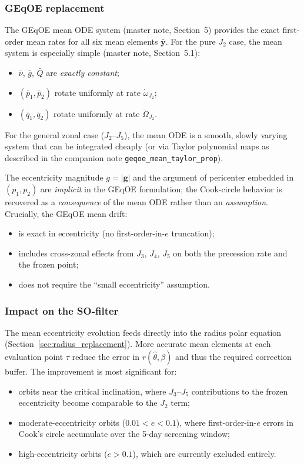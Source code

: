 \documentclass[11pt]{article}
\begin{document}
\subsubsection{GEqOE replacement}

The GEqOE mean ODE system (master note, Section~5) provides the exact
first-order mean rates for all six mean elements $\bar{\bm y}$. For the
pure $J_2$ case, the mean system is especially simple (master note,
Section~5.1):
\begin{itemize}
\item $\bar\nu$, $\bar g$, $\bar Q$ are \emph{exactly constant};
\item $(\bar p_1, \bar p_2)$ rotate uniformly at rate $\dot\omega_{J_2}$;
\item $(\bar q_1, \bar q_2)$ rotate uniformly at rate $\dot\Omega_{J_2}$.
\end{itemize}
For the general zonal case ($J_2$--$J_5$), the mean ODE is a smooth,
slowly varying system that can be integrated cheaply (or via Taylor polynomial
maps as described in the companion note \texttt{geqoe\_mean\_taylor\_prop}).

The eccentricity magnitude $g = |\bm g|$ and the argument of pericenter
embedded in $(p_1, p_2)$ are \emph{implicit} in the GEqOE formulation; the
Cook-circle behavior is recovered as a \emph{consequence} of the mean ODE
rather than an \emph{assumption}. Crucially, the GEqOE mean drift:
\begin{itemize}
\item is exact in eccentricity (no first-order-in-$e$ truncation);
\item includes cross-zonal effects from $J_3$, $J_4$, $J_5$ on both the
precession rate and the frozen point;
\item does not require the ``small eccentricity'' assumption.
\end{itemize}

\subsubsection{Impact on the SO-filter}

The mean eccentricity evolution feeds directly into the radius polar equation
(Section~\ref{sec:radius_replacement}). More accurate mean elements at each
evaluation point $\tau$ reduce the error in $r(\hat\theta, \beta)$ and thus
the required correction buffer. The improvement is most significant for:
\begin{itemize}
\item orbits near the critical inclination, where $J_3$--$J_5$ contributions
to the frozen eccentricity become comparable to the $J_2$ term;
\item moderate-eccentricity orbits ($0.01 < e < 0.1$), where first-order-in-$e$
errors in Cook's circle accumulate over the 5-day screening window;
\item high-eccentricity orbits ($e > 0.1$), which are currently excluded
entirely.
\end{itemize}
\end{document}
